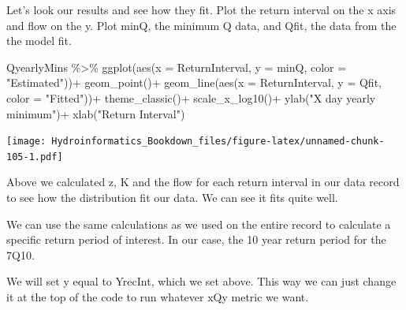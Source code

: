 \documentclass[
]{book}
\newenvironment{Shaded}{\begin{snugshade}}{\end{snugshade}}
\newcommand{\AttributeTok}[1]{\textcolor[rgb]{0.77,0.63,0.00}{#1}}
\newcommand{\FunctionTok}[1]{\textcolor[rgb]{0.00,0.00,0.00}{#1}}
\newcommand{\NormalTok}[1]{#1}
\newcommand{\SpecialCharTok}[1]{\textcolor[rgb]{0.00,0.00,0.00}{#1}}
\newcommand{\StringTok}[1]{\textcolor[rgb]{0.31,0.60,0.02}{#1}}
\begin{document}
Let's look our results and see how they fit. Plot the return interval on the x axis and flow on the y. Plot minQ, the minimum Q data, and Qfit, the data from the the model fit.

\begin{Shaded}
\begin{Highlighting}[]
\NormalTok{QyearlyMins }\SpecialCharTok{\%\textgreater{}\%} 
  \FunctionTok{ggplot}\NormalTok{(}\FunctionTok{aes}\NormalTok{(}\AttributeTok{x =}\NormalTok{ ReturnInterval, }\AttributeTok{y =}\NormalTok{ minQ, }\AttributeTok{color =} \StringTok{"Estimated"}\NormalTok{))}\SpecialCharTok{+}
  \FunctionTok{geom\_point}\NormalTok{()}\SpecialCharTok{+}
  \FunctionTok{geom\_line}\NormalTok{(}\FunctionTok{aes}\NormalTok{(}\AttributeTok{x =}\NormalTok{ ReturnInterval, }\AttributeTok{y =}\NormalTok{ Qfit, }\AttributeTok{color =} \StringTok{"Fitted"}\NormalTok{))}\SpecialCharTok{+}
  \FunctionTok{theme\_classic}\NormalTok{()}\SpecialCharTok{+}
  \FunctionTok{scale\_x\_log10}\NormalTok{()}\SpecialCharTok{+}
  \FunctionTok{ylab}\NormalTok{(}\StringTok{"X day yearly minimum"}\NormalTok{)}\SpecialCharTok{+}
  \FunctionTok{xlab}\NormalTok{(}\StringTok{"Return Interval"}\NormalTok{)}
\end{Highlighting}
\end{Shaded}

\texttt{[image: Hydroinformatics\_Bookdown\_files/figure-latex/unnamed-chunk-105-1.pdf]}

Above we calculated z, K and the flow for each return interval in our data record to see how the distribution fit our data. We can see it fits quite well.

We can use the same calculations as we used on the entire record to calculate a specific return period of interest. In our case, the 10 year return period for the 7Q10.

We will set y equal to YrecInt, which we set above. This way we can just change it at the top of the code to run whatever xQy metric we want.
\end{document}
